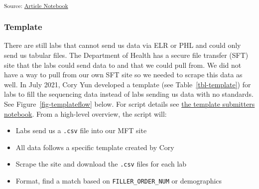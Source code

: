 \documentclass[
  letterpaper,
  DIV=11,
  numbers=noendperiod]{scrartcl}
\providecommand{\tightlist}{%
  \setlength{\itemsep}{0pt}\setlength{\parskip}{0pt}}\usepackage{longtable,booktabs,array}
\begin{document}
\textsubscript{Source:
\href{https://NW-PaGe.github.io/sequencing_integration_pipeline1.0/index.qmd.html}{Article
Notebook}}

\subsubsection{Template}\label{sec-template}

There are still labs that cannot send us data via ELR or PHL and could
only send us tabular files. The Department of Health has a secure file
transfer (SFT) site that the labs could send data to and that we could
pull from. We did not have a way to pull from our own SFT site so we
needed to scrape this data as well. In July 2021, Cory Yun developed a
template (see Table~\ref{tbl-template}) for labs to fill the sequencing
data instead of labs sending us data with no standards. See
Figure~\ref{fig-templateflow} below. For script details see
\href{notebooks/template_submitters.Rmd}{the template submitters
notebook}. From a high-level overview, the script will:

\begin{itemize}
\tightlist
\item
  Labs send us a \texttt{.csv} file into our MFT site\hspace{0pt}
\item
  All data follows a specific template created by Cory\hspace{0pt}
\item
  Scrape the site and download the \texttt{.csv} files for each
  lab\hspace{0pt}
\item
  Format, find a match based on \texttt{FILLER\_ORDER\_NUM} or
  demographics
\end{itemize}
\end{document}

